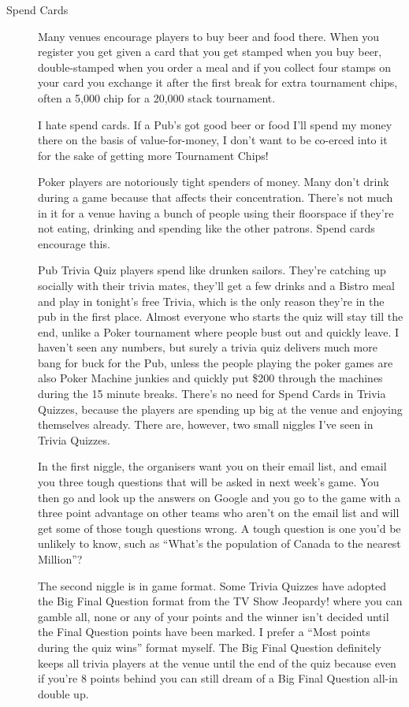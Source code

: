 \begin{description}

\item[Spend Cards] Many venues encourage players to buy beer and food there.
When you register you get given a card that you get stamped when you
buy beer, double-stamped when you order a meal and if you collect four
stamps on your card you exchange it after the first break for extra
tournament chips, often a 5,000 chip for a 20,000 stack tournament.

I hate spend cards. If a Pub's got good beer or food
I'll spend my money there on the basis of value-for-money, I don't
want to be co-erced into it for the sake of getting more Tournament Chips!

Poker players are notoriously tight spenders of money.
Many don't drink during a game because that affects their concentration.
There's not much in it for a venue having a bunch of people using
their floorspace if they're not eating, drinking and spending like
the other patrons. Spend cards encourage this.

Pub Trivia Quiz players spend like drunken sailors. They're catching
up socially with their trivia mates, they'll get a few drinks and a
Bistro meal and play in tonight's free Trivia, which is the only
reason they're in the pub in the first place. Almost everyone who
starts the quiz will stay till the end, unlike a Poker tournament
where people bust out and quickly leave. I haven't seen any numbers,
but surely a trivia quiz delivers much more bang for buck for the
Pub, unless the people playing the poker games are also Poker Machine
junkies and quickly put \$200 through the machines during the 15 minute
breaks. There's no need for Spend Cards in Trivia Quizzes, because the
players are spending up big at the venue and enjoying themselves already.
There are, however, two small niggles I've seen in Trivia Quizzes.

In the first niggle, the organisers want you on their email list, and
email you three tough questions that will be asked in next week's
game. You then go and look up the answers on Google and you go to the
game with a three point advantage on other teams who aren't on the
email list and will get some of those tough questions wrong. A tough
question is one you'd be unlikely to know, such as ``What's the
population of Canada to the nearest Million''?

The second niggle is in game format. Some Trivia Quizzes have adopted
the Big Final Question format from the TV Show Jeopardy! where you can
gamble all, none or any of your points and the winner isn't decided
until the Final Question points have been marked. I prefer a ``Most
points during the quiz wins'' format myself. The Big Final Question
definitely keeps all trivia players at the venue until the end of the
quiz because even if you're 8 points behind you can still dream of a
Big Final Question all-in double up.


\end{description}
